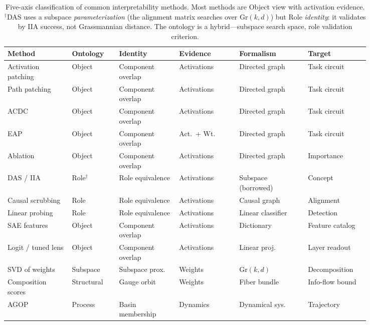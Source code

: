 \documentclass{article}
\newcommand{\Gr}{\mathrm{Gr}}
\begin{document}
\begin{table}[H]
\centering
\small
\setlength{\tabcolsep}{3.5pt}
\begin{tabular}{p{0.15\linewidth}p{0.11\linewidth}p{0.14\linewidth}p{0.14\linewidth}p{0.16\linewidth}p{0.14\linewidth}}
\toprule
\textbf{Method} & \textbf{Ontology} & \textbf{Identity} & \textbf{Evidence} & \textbf{Formalism} & \textbf{Target} \\
\midrule
Activation patching & Object & Component overlap & Activations & Directed graph & Task circuit \\[2pt]
Path patching       & Object & Component overlap & Activations & Directed graph & Task circuit \\[2pt]
ACDC                & Object & Component overlap & Activations & Directed graph & Task circuit \\[2pt]
EAP                 & Object & Component overlap & Act.\ + Wt. & Directed graph & Task circuit \\[2pt]
Ablation            & Object & Component overlap & Activations & Directed graph & Importance \\[2pt]
DAS / IIA           & Role$^\dagger$   & Role equivalence  & Activations & Subspace (borrowed) & Concept \\[2pt]
Causal scrubbing    & Role   & Role equivalence  & Activations & Causal graph & Alignment \\[2pt]
Linear probing      & Role   & Role equivalence  & Activations & Linear classifier & Detection \\[2pt]
SAE features        & Object & Component overlap & Activations & Dictionary & Feature catalog \\[2pt]
Logit / tuned lens  & Object & Component overlap & Activations & Linear proj. & Layer readout \\[2pt]
SVD of weights      & Subspace & Subspace prox. & Weights & $\Gr(k,d)$ & Decomposition \\[2pt]
Composition scores  & Structural & Gauge orbit  & Weights & Fiber bundle & Info-flow bound \\[2pt]
AGOP                & Process & Basin membership  & Dynamics & Dynamical sys. & Trajectory \\
\bottomrule
\end{tabular}
\caption{Five-axis classification of common interpretability methods.  Most
  methods are Object view with activation evidence.
  $^\dagger$DAS uses a subspace \emph{parameterization} (the alignment
  matrix searches over $\Gr(k,d)$) but Role \emph{identity}: it
  validates by IIA success, not Grassmannian distance.  The ontology is
  a hybrid---subspace search space, role validation criterion.}
\label{tab:methods}
\end{table}
\end{document}
